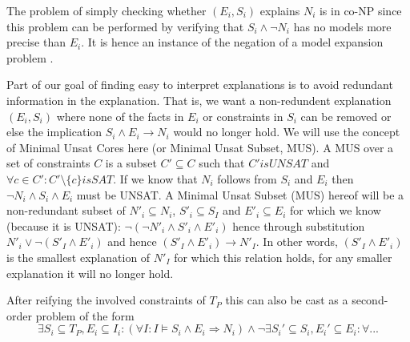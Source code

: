 The problem of simply checking whether $(E_i,S_i)$ explains $N_i$ is in co-NP since this problem can be performed by verifying that $S_i \land \lnot N_i$ has no models more precise than $E_i$. It is hence an instance of the negation of a model expansion problem \cite{ternovskaMXcomplexity}.


Part of our goal of finding easy to interpret explanations is to avoid redundant information in the explanation. That is, we want a non-redundent explanation $(E_i,S_i)$ where none of the facts in $E_i$ or constraints in $S_i$ can be removed or else the implication $S_i \wedge E_i \rightarrow N_i$ would no longer hold. We will use the concept of Minimal Unsat Cores here (or Minimal Unsat Subset, MUS). A MUS over a set of constraints $C$ is a subset $C' \subseteq C$ such that $C' is UNSAT$ and $\forall c \in C': C' \setminus \{c\} is SAT$. If we know that $N_i$ follows from $S_i$ and $E_i$ then $\neg N_i \wedge S_i \wedge E_i$ must be UNSAT. A Minimal Unsat Subset (MUS) hereof will be a non-redundant subset of $N'_i \subseteq N_i$, $S'_i \subseteq S_I$ and $E'_i \subseteq E_i$ for which we know (because it is UNSAT): $\neg (\neg N'_i \wedge S'_i \wedge E'_i)$ hence through substitution $N'_i \vee \neg (S'_I \wedge E'_i)$ and hence $(S'_I \wedge E'_i) \rightarrow N'_I$. In other words, $(S'_I \wedge E'_i)$ is the smallest explanation of $N'_I$ for which this relation holds, for any smaller explanation it will no longer hold.

After reifying the involved constraints of $T_P$ this can also be cast as a second-order problem of the form
\[\exists S_i\subseteq T_P, E_i\subseteq I_i: (\forall I: I\models S_i\land E_i \Rightarrow N_i) \land \lnot \exists S_i'\subseteq S_i, E_i'\subseteq E_i: \forall ... \]



